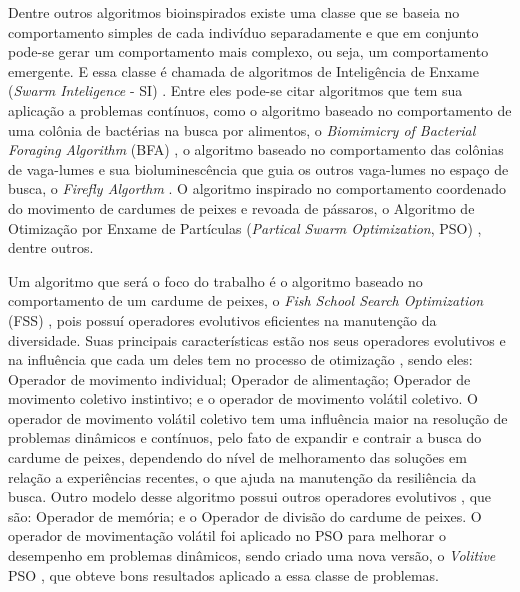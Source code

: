 Dentre outros algoritmos bioinspirados existe uma classe que se baseia no comportamento simples de cada indivíduo separadamente e que em conjunto pode-se gerar um comportamento mais complexo, ou seja, um comportamento emergente. E essa classe é chamada de algoritmos de Inteligência de Enxame (\textit{Swarm Inteligence} - SI) \cite{parpinelli2011new}. Entre eles pode-se citar algoritmos que tem sua aplicação a problemas contínuos, como o algoritmo baseado no comportamento de uma colônia de bactérias na busca por alimentos, o \textit{Biomimicry of Bacterial Foraging Algorithm} (BFA) \cite{passino2002biomimicry}, o algoritmo baseado no comportamento das colônias de vaga-lumes e sua bioluminescência que guia os outros vaga-lumes no espaço de busca, o \textit{Firefly Algorthm} \cite{firefly}. O algoritmo inspirado no comportamento coordenado do movimento de cardumes de peixes e revoada de pássaros, o Algoritmo de Otimização por Enxame de Partículas (\textit{Partical Swarm Optimization}, PSO) \cite{pso}, dentre outros.

Um algoritmo que será o foco do trabalho é o algoritmo baseado no comportamento de um cardume de peixes, o \textit{Fish School Search Optimization} (FSS) \cite{carmelo2008novel}, pois possuí operadores evolutivos eficientes na manutenção da diversidade. Suas principais características estão nos seus operadores evolutivos e na influência que cada um deles tem no processo de otimização \cite{c2009influence}, sendo eles: Operador de movimento individual; Operador de alimentação; Operador de movimento coletivo instintivo; e o operador de movimento volátil coletivo. O operador de movimento volátil coletivo tem uma influência maior na resolução de problemas dinâmicos e contínuos, pelo fato de expandir e contrair a busca do cardume de peixes, dependendo do nível de melhoramento das soluções em relação a experiências recentes, o que ajuda na manutenção da resiliência da busca. Outro modelo desse algoritmo possui outros operadores evolutivos \cite{madeiro2011density}, que são: Operador de memória; e o Operador de divisão do cardume de peixes. O operador de movimentação volátil foi aplicado no PSO para melhorar o desempenho em problemas dinâmicos, sendo criado uma nova versão, o \textit{Volitive} PSO \cite{cavalcanti2011hybrid}, que obteve bons resultados aplicado a essa classe de problemas.

